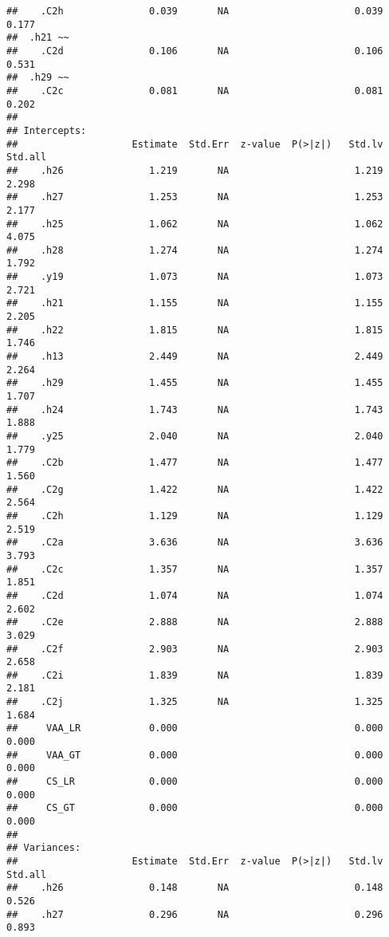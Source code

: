 \documentclass[
]{article}
\begin{document}
\begin{verbatim}
##    .C2h               0.039       NA                      0.039    0.177
##  .h21 ~~                                                                
##    .C2d               0.106       NA                      0.106    0.531
##  .h29 ~~                                                                
##    .C2c               0.081       NA                      0.081    0.202
## 
## Intercepts:
##                    Estimate  Std.Err  z-value  P(>|z|)   Std.lv  Std.all
##    .h26               1.219       NA                      1.219    2.298
##    .h27               1.253       NA                      1.253    2.177
##    .h25               1.062       NA                      1.062    4.075
##    .h28               1.274       NA                      1.274    1.792
##    .y19               1.073       NA                      1.073    2.721
##    .h21               1.155       NA                      1.155    2.205
##    .h22               1.815       NA                      1.815    1.746
##    .h13               2.449       NA                      2.449    2.264
##    .h29               1.455       NA                      1.455    1.707
##    .h24               1.743       NA                      1.743    1.888
##    .y25               2.040       NA                      2.040    1.779
##    .C2b               1.477       NA                      1.477    1.560
##    .C2g               1.422       NA                      1.422    2.564
##    .C2h               1.129       NA                      1.129    2.519
##    .C2a               3.636       NA                      3.636    3.793
##    .C2c               1.357       NA                      1.357    1.851
##    .C2d               1.074       NA                      1.074    2.602
##    .C2e               2.888       NA                      2.888    3.029
##    .C2f               2.903       NA                      2.903    2.658
##    .C2i               1.839       NA                      1.839    2.181
##    .C2j               1.325       NA                      1.325    1.684
##     VAA_LR            0.000                               0.000    0.000
##     VAA_GT            0.000                               0.000    0.000
##     CS_LR             0.000                               0.000    0.000
##     CS_GT             0.000                               0.000    0.000
## 
## Variances:
##                    Estimate  Std.Err  z-value  P(>|z|)   Std.lv  Std.all
##    .h26               0.148       NA                      0.148    0.526
##    .h27               0.296       NA                      0.296    0.893

\end{verbatim}
\end{document}
